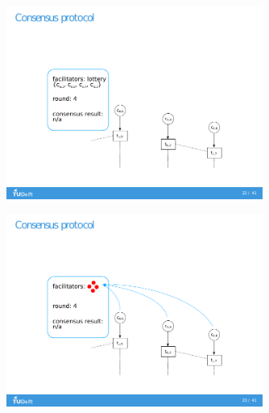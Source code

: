 \documentclass{beamer}
\begin{document}
\begin{frame}{\subsecname}
  \begin{figure}[h]
  \includegraphics[trim={2cm 1.5cm 2cm 1.5cm},clip,width=0.75\textwidth]{trustchain-3}
  \centering
  \end{figure}
\end{frame}

\begin{frame}{\subsecname}
  \begin{figure}[h]
  \includegraphics[trim={2cm 1.5cm 2cm 1.5cm},clip,width=0.75\textwidth]{trustchain-4}
  \centering
  \end{figure}
\end{frame}
\end{document}
